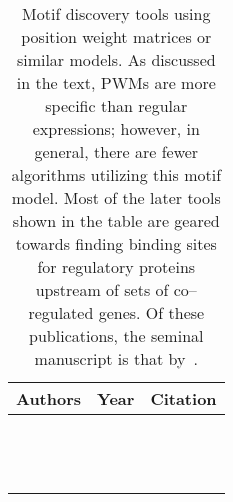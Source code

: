 \begin{table}[ptbh]
    \caption[Motif discovery tools using position weight matrices or similar models]{
        Motif discovery tools using position weight matrices or similar models.
        As discussed in the text, PWMs are more specific than regular expressions;
        however, in general, there are fewer algorithms utilizing this motif model.
        Most of the later tools shown in the table are geared towards
        finding binding sites for regulatory proteins upstream
        of sets of co--regulated genes.  Of these publications,
        the seminal manuscript is that by~\citet{lawrence1993detecting}.}
            \label{table:pwmMD}
                    \centering
            \begin{tabular}{lcc} \hline\hline
Authors & Year & Citation \\ \hline
\citeauthor{stormo1989identifying} & \citeyear{stormo1989identifying} & \cite{stormo1989identifying} \\
\citeauthor{lawrence1993detecting} & \citeyear{lawrence1993detecting} & \cite{lawrence1993detecting} \\
\citeauthor{liu1994collapsed} & \citeyear{liu1994collapsed} & \cite{liu1994collapsed} \\
\citeauthor{bailey1994fitting} & \citeyear{bailey1994fitting} & \cite{bailey1994fitting} \\
\citeauthor{leung1996over} & \citeyear{leung1996over} & \cite{leung1996over} \\
\citeauthor{goffeau1998genomic-scale} & \citeyear{goffeau1998genomic-scale} & \cite{goffeau1998genomic-scale} \\
\citeauthor{hertz1999identifying} & \citeyear{hertz1999identifying} & \cite{hertz1999identifying} \\
\citeauthor{workman2000ann-spec} & \citeyear{workman2000ann-spec} & \cite{workman2000ann-spec} \\
\citeauthor{hughes2000computational} & \citeyear{hughes2000computational} & \cite{hughes2000computational} \\
\citeauthor{guhathakurta2001identifying} & \citeyear{guhathakurta2001identifying} & \cite{guhathakurta2001identifying} \\
\citeauthor{bi2004bipartite} & \citeyear{bi2004bipartite} & \cite{bi2004bipartite} \\
\citeauthor{raphael2004uniform} & \citeyear{raphael2004uniform} & \cite{raphael2004uniform} \\
\citeauthor{eskin2004from} & \citeyear{eskin2004from} & \cite{eskin2004from} \\

\end{tabular}
\end{table}
